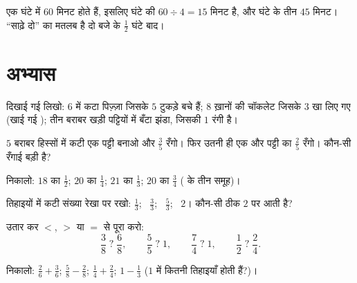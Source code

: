\begin{example}[घंटे की चौथाइयाँ]\label{ex:g4:fractions:hour}
एक घंटे में $60$ मिनट होते हैं, इसलिए घंटे की 
$60 \div 4 = 15$ मिनट है, और घंटे के तीन 
$45$ मिनट। ``साढ़े दो'' का मतलब है दो बजे के $\frac12$ घंटे
बाद।
\end{example}

\section{अभ्यास}

\begin{exercise}[$\star$]\label{exo:g4:fractions:1}
दिखाई गई  लिखो: $6$ में कटा पिज़्ज़ा जिसके $5$ टुकड़े बचे
हैं; $8$ ख़ानों की चॉकलेट जिसके $3$ खा लिए गए (खाई गई );
तीन बराबर खड़ी पट्टियों में बँटा झंडा, जिसकी $1$ रंगी है।
\end{exercise}

\begin{exercise}[$\star$]\label{exo:g4:fractions:2}
$5$ बराबर हिस्सों में कटी एक पट्टी बनाओ और $\frac35$ रँगो। फिर
उतनी ही एक और पट्टी का $\frac{2}{5}$ रँगो। कौन-सी रँगाई बड़ी है?
\end{exercise}

\begin{exercise}[$\star$]\label{exo:g4:fractions:3}
निकालो: $18$ का $\frac12$; \quad $20$ का $\frac14$; \quad
$21$ का $\frac13$; \quad $20$ का $\frac34$ ( के तीन
समूह)।
\end{exercise}

\begin{exercise}[$\star$]\label{exo:g4:fractions:4}
तिहाइयों में कटी संख्या रेखा पर रखो: $\frac13$; \ $\frac33$; \
$\frac53$; \ $2$। कौन-सी  ठीक $2$ पर आती है?
\end{exercise}

\begin{exercise}[$\star$]\label{exo:g4:fractions:5}
उतार कर $<$, $>$ या $=$ से पूरा करो:
\[
\frac38 \;?\; \frac68, \qquad
\frac55 \;?\; 1, \qquad
\frac74 \;?\; 1, \qquad
\frac12 \;?\; \frac24 .
\]
\end{exercise}

\begin{exercise}[$\star$]\label{exo:g4:fractions:6}
निकालो: $\frac26 + \frac36$; \quad $\frac58 - \frac28$; \quad
$\frac14 + \frac24$; \quad $1 - \frac13$ ($1$ में कितनी तिहाइयाँ
होती हैं?)।
\end{exercise}

